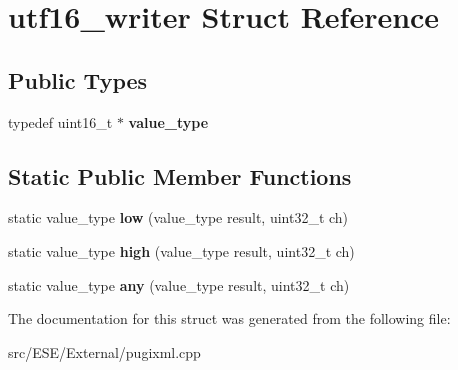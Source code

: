 \hypertarget{structutf16__writer}{\section{utf16\-\_\-writer Struct Reference}
\label{structutf16__writer}
}
\subsection*{Public Types}
\begin{DoxyCompactItemize}
\item 
\hypertarget{structutf16__writer_a527b705eaf5099167b8bc42423ce918c}{typedef uint16\-\_\-t $\ast$ {\bfseries value\-\_\-type}}\label{structutf16__writer_a527b705eaf5099167b8bc42423ce918c}

\end{DoxyCompactItemize}
\subsection*{Static Public Member Functions}
\begin{DoxyCompactItemize}
\item 
\hypertarget{structutf16__writer_ab11fef721a8b38de5e315d2e75d12956}{static value\-\_\-type {\bfseries low} (value\-\_\-type result, uint32\-\_\-t ch)}\label{structutf16__writer_ab11fef721a8b38de5e315d2e75d12956}

\item 
\hypertarget{structutf16__writer_a01b6ce1a567dea11daead3ca83f42d5c}{static value\-\_\-type {\bfseries high} (value\-\_\-type result, uint32\-\_\-t ch)}\label{structutf16__writer_a01b6ce1a567dea11daead3ca83f42d5c}

\item 
\hypertarget{structutf16__writer_ac14e06db126fbbef4be7efdb80fbdf4a}{static value\-\_\-type {\bfseries any} (value\-\_\-type result, uint32\-\_\-t ch)}\label{structutf16__writer_ac14e06db126fbbef4be7efdb80fbdf4a}

\end{DoxyCompactItemize}


The documentation for this struct was generated from the following file\-:\begin{DoxyCompactItemize}
\item 
src/\-E\-S\-E/\-External/pugixml.\-cpp\end{DoxyCompactItemize}
